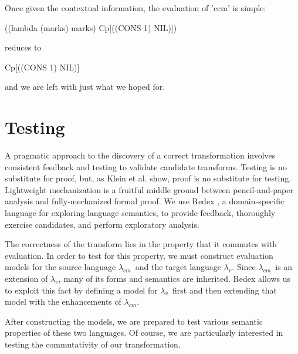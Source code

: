 \documentclass{llncs}
\newcommand{\cm}[0]{$\lambda_{cm}$}
\newcommand{\lv}[0]{$\lambda_v$}
\begin{document}
Once given the contextual information, the evaluation of \scheme'ccm' is simple:
\begin{schemedisplay}
((lambda (marks) marks)
 Cp[((CONS 1) NIL)])
\end{schemedisplay}
reduces to
\begin{schemedisplay}
Cp[((CONS 1) NIL)]
\end{schemedisplay}
and we are left with just what we hoped for.

\section{Testing}
\label{sec-testing}

A pragmatic approach to the discovery of a correct transformation involves consistent feedback and testing to validate candidate transforms. Testing is no substitute for proof, but, as Klein et al. \cite{klein2012run} show, proof is no substitute for testing. Lightweight mechanization is a fruitful middle ground between pencil-and-paper analysis and fully-mechanized formal proof. We use Redex \cite{findler2010redex}, a domain-specific language for exploring language semantics, to provide feedback, thoroughly exercise candidates, and perform exploratory analysis.

The correctness of the transform lies in the property that it commutes with evaluation. In order to test for this property, we must construct evaluation models for the source language \cm\ and the target language \lv. Since \cm\ is an extension of \lv, many of its forms and semantics are inherited. Redex allows us to exploit this fact by defining a model for \lv\ first and then extending that model with the enhancements of \cm.

After constructing the models, we are prepared to test various semantic properties of these two languages. Of course, we are particularly interested in testing the commutativity of our transformation.


\end{document}
